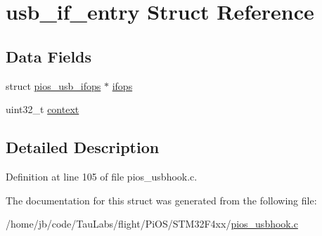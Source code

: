 \hypertarget{structusb__if__entry}{\section{usb\-\_\-if\-\_\-entry \-Struct \-Reference}
\label{structusb__if__entry}
}
\subsection*{\-Data \-Fields}
\begin{DoxyCompactItemize}
\item 
struct \hyperlink{structpios__usb__ifops}{pios\-\_\-usb\-\_\-ifops} $\ast$ \hyperlink{group___p_i_o_s___u_s_b_h_o_o_k_ga8c6a8d1a868734fd250c8af665a54c3c}{ifops}
\item 
uint32\-\_\-t \hyperlink{group___p_i_o_s___u_s_b_h_o_o_k_gad9a6d740530f937ee0fd2870b5c02ce8}{context}
\end{DoxyCompactItemize}


\subsection{\-Detailed \-Description}


\-Definition at line 105 of file pios\-\_\-usbhook.\-c.



\-The documentation for this struct was generated from the following file\-:\begin{DoxyCompactItemize}
\item 
/home/jb/code/\-Tau\-Labs/flight/\-Pi\-O\-S/\-S\-T\-M32\-F4xx/\hyperlink{_s_t_m32_f4xx_2pios__usbhook_8c}{pios\-\_\-usbhook.\-c}\end{DoxyCompactItemize}
